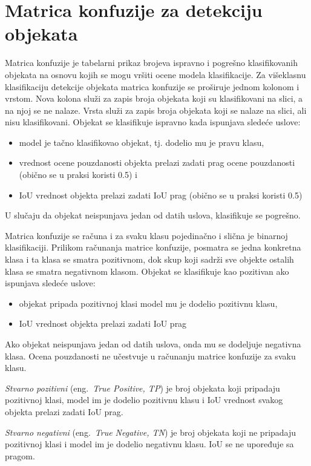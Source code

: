 \documentclass[12pt,oneside]{memoir}
\begin{document}
\section{Matrica konfuzije za detekciju objekata}

Matrica konfuzije je tabelarni prikaz brojeva ispravno i pogrešno klasifikovanih objekata na osnovu kojih se mogu vršiti ocene modela klasifikacije. Za višeklasnu klasifikaciju detekcije objekata matrica konfuzije se proširuje jednom kolonom i vrstom. Nova kolona služi za zapis broja objekata koji su klasifikovani na slici, a na njoj se ne nalaze. Vrsta služi za zapis broja objekata koji se nalaze na slici, ali nisu klasifikovani.
Objekat se klasifikuje ispravno kada ispunjava sledeće uslove:
\begin{itemize}
    \item model je tačno klasifikovao objekat, tj. dodelio mu je pravu klasu,
    \item vrednost ocene pouzdanosti objekta prelazi zadati prag ocene pouzdanosti (obično se u praksi koristi 0.5) i 
    \item IoU vrednost objekta prelazi zadati IoU prag (obično se u praksi koristi 0.5)
\end{itemize}
U slučaju da objekat neispunjava jedan od datih uslova, klasifikuje se pogrešno. 

Matrica konfuzije se računa i za svaku klasu pojedinačno i slična je binarnoj klasifikaciji. Prilikom računanja matrice konfuzije, posmatra se jedna konkretna klasa i ta klasa se smatra pozitivnom, dok skup koji sadrži sve objekte ostalih klasa se smatra negativnom klasom.
Objekat se klasifikuje kao pozitivan ako ispunjava sledeće uslove:
\begin{itemize}
    \item objekat pripada pozitivnoj klasi model mu je dodelio pozitivnu klasu,
    \item IoU vrednost objekta prelazi zadati IoU prag
\end{itemize}
Ako objekat neispunjava jedan od datih uslova, onda mu se dodeljuje negativna klasa. Ocena pouzdanosti ne učestvuje u računanju matrice konfuzije za svaku klasu.

\textit{Stvarno pozitivni} (eng.~\textit{True Positive, TP}) je broj objekata koji pripadaju pozitivnoj klasi, model im je dodelio pozitivnu klasu i IoU vrednost svakog objekta prelazi zadati IoU prag.

\textit{Stvarno negativni} (eng.~\textit{True Negative, TN}) je broj objekata koji ne pripadaju pozitivnoj klasi i model im je dodelio negativnu klasu. IoU se ne upoređuje sa pragom.
\end{document}
